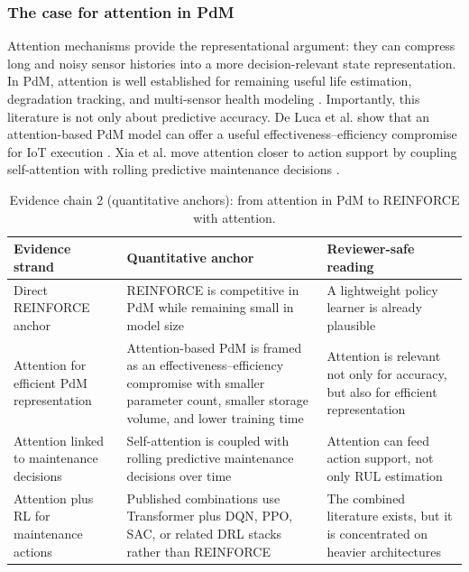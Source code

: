 \documentclass[sn-basic]{sn-jnl} %
\begin{document}
\subsubsection{The case for attention in PdM}
Attention mechanisms provide the representational argument: they can compress long and noisy sensor histories into a more decision-relevant state representation. In PdM, attention is well established for remaining useful life estimation, degradation tracking, and multi-sensor health modeling \cite{Chen2020, Chen2021, Chadha2022, DeLuca2023}. Importantly, this literature is not only about predictive accuracy. De Luca et al. show that an attention-based PdM model can offer a useful effectiveness--efficiency compromise for IoT execution \cite{DeLuca2023}. Xia et al. move attention closer to action support by coupling self-attention with rolling predictive maintenance decisions \cite{Xia2022}.

\begin{table}[t]
        \centering
        \small
        \setlength{\tabcolsep}{4pt}
        \begin{tabular}{p{} p{} p{}}
                \toprule
                Evidence strand & Quantitative anchor & Reviewer-safe reading \\
                \midrule
                Direct REINFORCE anchor & REINFORCE is competitive in PdM while remaining small in model size \cite{Siraskar2025} & A lightweight policy learner is already plausible \\
                Attention for efficient PdM representation & Attention-based PdM is framed as an effectiveness--efficiency compromise with smaller parameter count, smaller storage volume, and lower training time \cite{DeLuca2023} & Attention is relevant not only for accuracy, but also for efficient representation \\
                Attention linked to maintenance decisions & Self-attention is coupled with rolling predictive maintenance decisions over time \cite{Xia2022} & Attention can feed action support, not only RUL estimation \\
                Attention plus RL for maintenance actions & Published combinations use Transformer plus DQN, PPO, SAC, or related DRL stacks rather than REINFORCE \cite{Zhao2024, Zhang2023, Guo2026} & The combined literature exists, but it is concentrated on heavier architectures \\
                \bottomrule
        \end{tabular}
        \caption{Evidence chain 2 (quantitative anchors): from attention in PdM to REINFORCE with attention.}
        \label{tab:evidence_chain2_quant}
\end{table}
\end{document}
